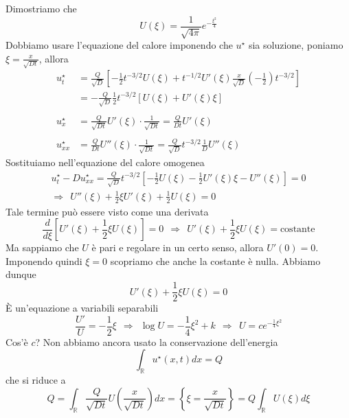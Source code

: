 \documentclass[10pt,a4paper,twoside,openright]{book}
\begin{document}
Dimostriamo che
\begin{equation*}
U(\xi) =\frac{1}{\sqrt{4\pi }} e^{-\frac{\xi ^{2}}{4}}
\end{equation*}
Dobbiamo usare l'equazione del calore imponendo che $u^{\star }$ sia soluzione, poniamo $\xi =\frac{x}{\sqrt{Dt}}$, allora
\begin{align*}
u^{\star }_{t} & =\frac{Q}{\sqrt{D}}\left[ -\frac{1}{2} t^{-3/2} U(\xi) +t^{-1/2} U'(\xi)\frac{x}{\sqrt{D}}\left( -\frac{1}{2}\right) t^{-3/2}\right]\\
 & =-\frac{Q}{\sqrt{D}}\frac{1}{2} t^{-3/2}[ U(\xi) +U'(\xi) \xi ]\\
 & \\
u^{\star }_{x} & =\frac{Q}{\sqrt{Dt}} U'(\xi) \cdotp \frac{1}{\sqrt{Dt}} =\frac{Q}{Dt} U'(\xi)\\
 & \\
u^{\star }_{xx} & =\frac{Q}{Dt} U''(\xi) \cdotp \frac{1}{\sqrt{Dt}} =\frac{Q}{\sqrt{D}} t^{-3/2}\frac{1}{D} U''(\xi)
\end{align*}
Sostituiamo nell'equazione del calore omogenea
\begin{gather*}
u^{\star }_{t} -Du^{\star }_{xx} =\frac{Q}{\sqrt{D}} t^{-3/2}\left[ -\frac{1}{2} U(\xi) -\frac{1}{2} U'(\xi) \xi -U''(\xi)\right] =0\\
\Rightarrow \ \ U''(\xi) +\frac{1}{2} \xi U'(\xi) +\frac{1}{2} U(\xi) =0
\end{gather*}
Tale termine può essere visto come una derivata
\begin{equation*}
\frac{d}{d\xi }\left[ U'(\xi) +\frac{1}{2} \xi U(\xi)\right] =0\ \ \Rightarrow \ \ U'(\xi) +\frac{1}{2} \xi U(\xi) =\text{costante}
\end{equation*}
Ma sappiamo che $U$ è pari e regolare in un certo senso, allora $U'(0) =0$. Imponendo quindi $\xi =0$ scopriamo che anche la costante è nulla. Abbiamo dunque
\begin{equation*}
U'(\xi) +\frac{1}{2} \xi U(\xi) =0
\end{equation*}
È un'equazione a variabili separabili
\begin{equation*}
\frac{U'}{U} =-\frac{1}{2} \xi \ \ \Rightarrow \ \ \log U=-\frac{1}{4} \xi ^{2} +k\ \ \Rightarrow \ \ U=ce^{-\frac{1}{4} \xi ^{2}}
\end{equation*}
Cos'è $c$? Non abbiamo ancora usato la conservazione dell'energia
\begin{equation*}
\int _{\mathbb{R}} u^{\star }(x,t) dx=Q
\end{equation*}
che si riduce a
\begin{equation*}
Q = \int _{\mathbb{R}}\frac{Q}{\sqrt{Dt}} U\left(\frac{x}{\sqrt{Dt}}\right) dx=\left\{\xi=\frac{x}{\sqrt{Dt}}\right\} = Q\int _{\mathbb{R}} U(\xi) d\xi
\end{equation*}
\end{document}
